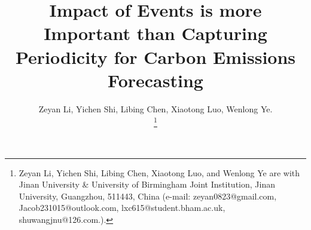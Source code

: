 \documentclass[conference]{IEEEtran}
\begin{document}
\title{Impact of Events is more Important than Capturing Periodicity for Carbon Emissions Forecasting}

\author{
\and
{}

\and
{}
}

\author{Zeyan Li, Yichen Shi, Libing Chen, Xiaotong Luo, Wenlong Ye.

\thanks{Zeyan Li, Yichen Shi, Libing Chen, Xiaotong Luo, and Wenlong Ye are with Jinan University \& University of Birmingham Joint Institution, Jinan University, Guangzhou, 511443, China (e-mail: zeyan0823@gmail.com, Jacob231015@outlook.com, lxc615@student.bham.ac.uk, shuwangjnu@126.com.).}
}


\maketitle
\end{document}
